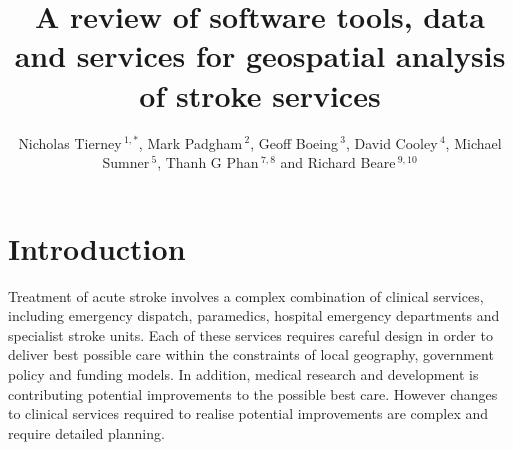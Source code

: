 \documentclass[utf8]{frontiersHLTH}
\def\firstAuthorLast{FirstAuthor {et~al.}} %
\def\Authors{Nicholas Tierney\,$^{1,*}$, Mark Padgham\,$^{2}$, Geoff Boeing\,$^{3}$, David Cooley\,$^{4}$, Michael Sumner\,$^{5}$, Thanh G Phan\,$^{7,8}$ and Richard Beare\,$^{9,10}$}
\begin{document}
\onecolumn
{}

\title[Software tools for geospatial analysis]{A review of software tools, data and services for geospatial analysis of stroke services}

\author[\firstAuthorLast ]{\Authors} %
\address{} %
\correspondance{} %

\extraAuth{}%

\maketitle

\section{Introduction}\label{introduction}

Treatment of acute stroke involves a complex combination of clinical
services, including emergency dispatch, paramedics, hospital emergency
departments and specialist stroke units. Each of these services
requires careful design in order to deliver best possible care within
the constraints of local geography, government policy and funding
models. In addition, medical research and development is contributing
potential improvements to the possible best care. However changes to
clinical services required to realise potential improvements are
complex and require detailed planning.
\end{document}
